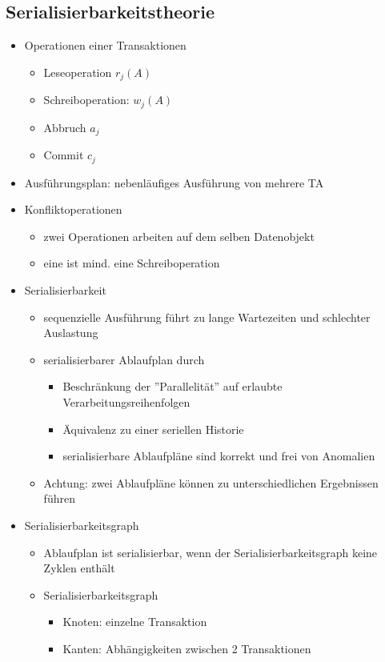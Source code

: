 \documentclass[a4paper]{article}
\begin{document}
\subsection{Serialisierbarkeitstheorie}
\begin{itemize}
    \item Operationen einer Transaktionen
    \begin{itemize}
        \item Leseoperation $r_j(A)$
        \item Schreiboperation: $w_j(A)$
        \item Abbruch $a_j$
        \item Commit $c_j$
    \end{itemize}
    \item Ausführungsplan: nebenläufiges Ausführung von mehrere TA
    \item Konfliktoperationen
    \begin{itemize}
        \item zwei Operationen arbeiten auf dem selben Datenobjekt
        \item eine ist mind. eine Schreiboperation
    \end{itemize}
    
    \item Serialisierbarkeit
    \begin{itemize}
        \item sequenzielle Ausführung führt zu lange Wartezeiten und schlechter Auslastung
        \item serialisierbarer Ablaufplan durch
        \begin{itemize}
            \item Beschränkung der ''Parallelität'' auf erlaubte Verarbeitungsreihenfolgen
            \item Äquivalenz zu einer seriellen Historie
            \item serialisierbare Ablaufpläne sind korrekt und frei von Anomalien
        \end{itemize}
        \item Achtung: zwei Ablaufpläne können zu unterschiedlichen Ergebnissen führen
    \end{itemize}
        
    \item Serialisierbarkeitsgraph
    \begin{itemize}
        \item Ablaufplan ist serialisierbar, wenn der Serialisierbarkeitsgraph keine Zyklen enthält
        \item Serialisierbarkeitsgraph
        \begin{itemize}
            \item Knoten: einzelne Transaktion
            \item Kanten: Abhängigkeiten zwischen 2 Transaktionen
        \end{itemize}
    \end{itemize}
\end{itemize}
\end{document}

